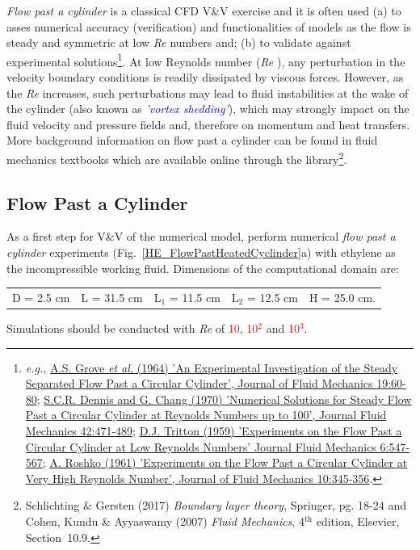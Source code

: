 \documentclass[12pts,a4paper,amsmath,amssymb,floatfix]{article}%
\newcommand{\red}{\textcolor{red}}
\newcommand{\blue}{\textcolor{blue}}
\newcommand{\eg}{{\it e.g., }}
\newcommand\Rey{\mbox{\textit{Re}}\,\,}
\newcommand{\vv}{V$\&$V }
\begin{document}
                {\it Flow past a cylinder} is a classical CFD \vv exercise and it is often used (a) to asses numerical accuracy (verification) and functionalities of models as the flow is steady and symmetric at low \Rey numbers and; (b) to validate against experimental solutions\footnote{\eg \href{https://doi.org/10.1017/S0022112064000544}{A.S. Grove {\it et al.} (1964) 'An Experimental Investigation of the Steady Separated Flow Past a Circular Cylinder', Journal of Fluid Mechanics 19:60-80}; \href{https://doi.org/10.1017/S0022112070001428}{S.C.R. Dennis and G. Chang (1970) 'Numerical Solutions for Steady Flow Past a Circular Cylinder at Reynolds Numbers up to 100', Journal Fluid Mechanics 42:471-489}; \href{https://doi.org/10.1017/S0022112059000829}{D.J. Tritton (1959) 'Experiments on the Flow Past a Circular Cylinder at Low Reynolds Numbers'  Journal Fluid Mechanics 6:547-567}; \href{https://doi.org/10.1017/S0022112061000950}{A. Roshko (1961) 'Experiments on the Flow Past a Circular Cylinder at Very High Reynolds Number', Journal of Fluid Mechanics 10:345-356}.}. At low Reynolds number (\Rey), any perturbation in the velocity boundary conditions is readily dissipated by viscous forces. However, as the \Rey increases, such perturbations may lead to fluid instabilities at the wake of the cylinder (also known as \blue{\it 'vortex shedding'}), which may strongly impact on the fluid velocity and pressure fields and, therefore on momentum and heat transfers. More background information on flow past a cylinder can be found in fluid mechanics textbooks which are available online through the library\footnote{Schlichting $\&$ Gersten (2017) \emph{Boundary layer theory}, Springer, pg. 18-24 and Cohen, Kundu \& Ayyaswamy (2007) \emph{Fluid Mechanics}, 4$^{\text{th}}$ edition, Elsevier, Section~10.9.}.

     \subsection{Flow Past a Cylinder}\label{FlowPastCylinder}
     As a first step for \vv of the numerical model, perform numerical {\it flow past a cylinder} experiments (Fig.~\ref{HE_FlowPastHeatedCyclinder}a) with ethylene as the incompressible working fluid. Dimensions of the computational domain are:
     \begin{center}
       \begin{tabular}{c c c c c}
            D = 2.5 cm & L = 31.5 cm & L$_{1}$ = 11.5 cm & L$_{2}$ = 12.5 cm & H = 25.0 cm.
       \end{tabular}
     \end{center}
     Simulations should be conducted with \Rey of \red{10}, \red{10$^{2}$} and \red{10$^{3}$}.
\end{document}

